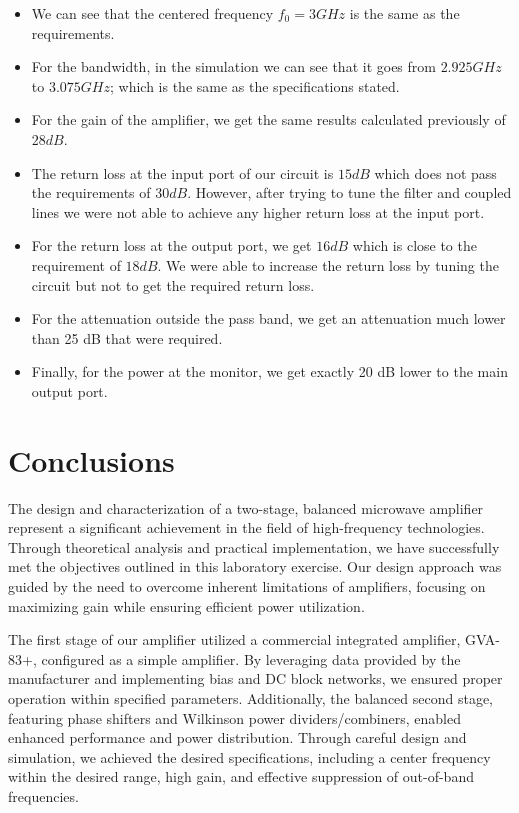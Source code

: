 \documentclass[12pt]{report} %
\let\oldsection\section
\renewcommand\section{\clearpage\oldsection}
\begin{document}
\begin{itemize}
    \item  We can see that the centered frequency $f_0 = 3 GHz$ is the same as the requirements. 
    \item For the bandwidth, in the simulation we can see that it goes from $2.925 GHz$ to $3.075 GHz$; which is the same as the specifications stated.
    \item For the gain of the amplifier, we get the same results calculated previously of $28 dB$.
    \item The return loss at the input port of our circuit is $15 dB$ which does not pass the requirements of $30 dB$. However, after trying to tune the filter and coupled lines we were not able to achieve any higher return loss at the input port.
    \item For the return loss at the output port, we get $16 dB$ which is close to the requirement of $18 dB$. We were able to increase the return loss by tuning the circuit but not to get the required return loss.
    \item For the attenuation outside the pass band, we get an attenuation much lower than 25 dB that were required.
    \item Finally, for the power at the monitor, we get exactly 20 dB lower to the main output port.
\end{itemize}

\section{Conclusions} 

The design and characterization of a two-stage, balanced microwave amplifier represent a significant achievement in the field of high-frequency technologies. Through theoretical analysis and practical implementation, we have successfully met the objectives outlined in this laboratory exercise. Our design approach was guided by the need to overcome inherent limitations of amplifiers, focusing on maximizing gain while ensuring efficient power utilization.

The first stage of our amplifier utilized a commercial integrated amplifier, GVA-83+, configured as a simple amplifier. By leveraging data provided by the manufacturer and implementing bias and DC block networks, we ensured proper operation within specified parameters. Additionally, the balanced second stage, featuring phase shifters and Wilkinson power dividers/combiners, enabled enhanced performance and power distribution. Through careful design and simulation, we achieved the desired specifications, including a center frequency within the desired range, high gain, and effective suppression of out-of-band frequencies.
\end{document}
